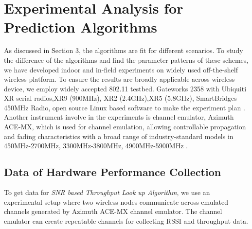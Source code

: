 \section{Experimental Analysis for Prediction Algorithms}
\label{sec:experiment design}


As discussed in Section 3, the algorithms are fit for different scenarios. To study the difference of the algorithms and find the parameter patterns of these schemes, we have developed indoor and in-field experiments 
on widely used off-the-shelf wireless platform.
To ensure the results are broadly applicable across wireless device, we employ widely accepted 802.11 testbed. Gateworks 2358 with Ubiquiti XR serial radios,XR9 (900MHz), XR2 (2.4GHz),XR5 (5.8GHz), SmartBridges 450MHz Radio, open source Linux based software to make the experiment plan \cite{Gateworks,Ubnt,Openwrt}. 
Another instrument involve in the experiments is channel emulator,
Azimuth ACE-MX, which is used for channel emulation, allowing controllable propagation and fading characteristics with a broad range of industry-standard models in 450MHz-2700MHz, 3300MHz-3800MHz, 4900MHz-5900MHz \cite{AzimuthACE}. 


\subsection{Data of Hardware Performance Collection}
\label{subsec:ichannel}
To get data for \emph{SNR based Throughput Look up Algorithm}, we use an experimental setup where two wireless nodes communicate across emulated channels generated by Azimuth ACE-MX channel emulator. 
The channel emulator can create repeatable channels for collecting RSSI and throughput data.

